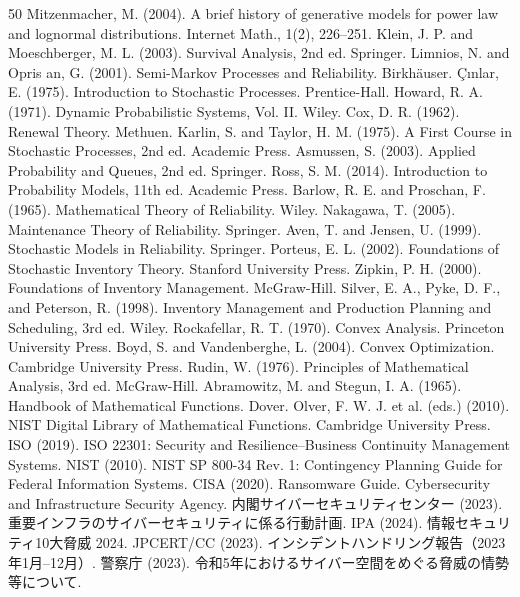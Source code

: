 \begin{thebibliography}{50}
 Mitzenmacher, M. (2004). A brief history of generative models for power law and lognormal distributions. Internet Math., 1(2), 226--251.
 Klein, J. P. and Moeschberger, M. L. (2003). Survival Analysis, 2nd ed. Springer.
 Limnios, N. and Opris an, G. (2001). Semi-Markov Processes and Reliability. Birkhäuser.
 Çınlar, E. (1975). Introduction to Stochastic Processes. Prentice-Hall.
 Howard, R. A. (1971). Dynamic Probabilistic Systems, Vol. II. Wiley.
 Cox, D. R. (1962). Renewal Theory. Methuen.
 Karlin, S. and Taylor, H. M. (1975). A First Course in Stochastic Processes, 2nd ed. Academic Press.
 Asmussen, S. (2003). Applied Probability and Queues, 2nd ed. Springer.
 Ross, S. M. (2014). Introduction to Probability Models, 11th ed. Academic Press.
 Barlow, R. E. and Proschan, F. (1965). Mathematical Theory of Reliability. Wiley.
 Nakagawa, T. (2005). Maintenance Theory of Reliability. Springer.
 Aven, T. and Jensen, U. (1999). Stochastic Models in Reliability. Springer.
 Porteus, E. L. (2002). Foundations of Stochastic Inventory Theory. Stanford University Press.
 Zipkin, P. H. (2000). Foundations of Inventory Management. McGraw-Hill.
 Silver, E. A., Pyke, D. F., and Peterson, R. (1998). Inventory Management and Production Planning and Scheduling, 3rd ed. Wiley.
 Rockafellar, R. T. (1970). Convex Analysis. Princeton University Press.
 Boyd, S. and Vandenberghe, L. (2004). Convex Optimization. Cambridge University Press.
 Rudin, W. (1976). Principles of Mathematical Analysis, 3rd ed. McGraw-Hill.
 Abramowitz, M. and Stegun, I. A. (1965). Handbook of Mathematical Functions. Dover.
 Olver, F. W. J. et al. (eds.) (2010). NIST Digital Library of Mathematical Functions. Cambridge University Press.
 ISO (2019). ISO 22301: Security and Resilience--Business Continuity Management Systems.
 NIST (2010). NIST SP 800-34 Rev. 1: Contingency Planning Guide for Federal Information Systems.
 CISA (2020). Ransomware Guide. Cybersecurity and Infrastructure Security Agency.
 内閣サイバーセキュリティセンター (2023). 重要インフラのサイバーセキュリティに係る行動計画.
 IPA (2024). 情報セキュリティ10大脅威 2024.
 JPCERT/CC (2023). インシデントハンドリング報告（2023年1月--12月）.
 警察庁 (2023). 令和5年におけるサイバー空間をめぐる脅威の情勢等について.
\end{thebibliography}
